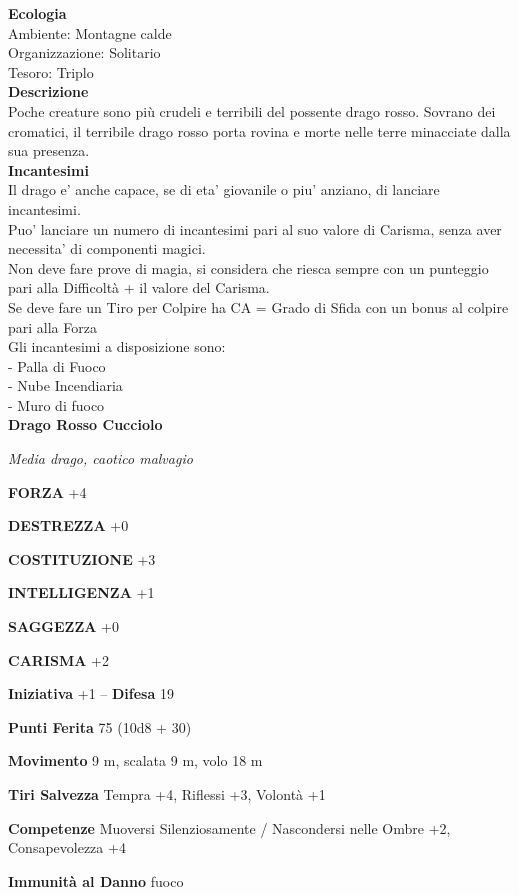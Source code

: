 \begin{multicols}{2}
\textbf{Ecologia}\\
Ambiente: Montagne calde\\
Organizzazione: Solitario\\
Tesoro: Triplo\\
\textbf{Descrizione}\\
Poche creature sono più crudeli e terribili del possente drago rosso. Sovrano dei cromatici, il terribile drago rosso porta rovina e morte nelle terre minacciate dalla sua presenza.\\
\textbf{Incantesimi}\\
Il drago e' anche capace, se di eta' giovanile o piu' anziano, di lanciare incantesimi.\\
Puo' lanciare un numero di incantesimi pari al suo valore di Carisma, senza aver necessita' di componenti magici.\\
Non deve fare prove di magia, si considera che riesca sempre con un punteggio pari alla Difficoltà + il valore del Carisma.\\
Se deve fare un Tiro per Colpire ha CA = Grado di Sfida con un bonus al colpire pari alla Forza\\
Gli incantesimi a disposizione sono:\\
- Palla di Fuoco\\
- Nube Incendiaria\\
- Muro di fuoco\\


\medskip{}\textbf{Drago Rosso Cucciolo}

\emph{Media drago, caotico malvagio}

\textbf{FORZA} +4

\textbf{DESTREZZA} +0

\textbf{COSTITUZIONE} +3

\textbf{INTELLIGENZA} +1

\textbf{SAGGEZZA} +0

\textbf{CARISMA} +2

\textbf{Iniziativa} +1 -- \textbf{Difesa} 19

\textbf{Punti Ferita} 75 (10d8 + 30)

\textbf{Movimento} 9 m, scalata 9 m, volo 18 m

\textbf{Tiri Salvezza} Tempra +4, Riflessi +3, Volontà +1

\textbf{Competenze} Muoversi Silenziosamente / Nascondersi nelle Ombre +2, Consapevolezza +4

\textbf{Immunità al Danno} fuoco


\end{multicols}

